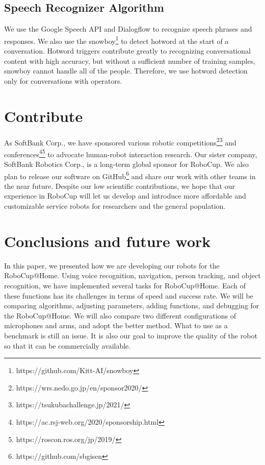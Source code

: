 \documentclass[runningheads,a4paper]{llncs}
\begin{document}
\subsection{Speech Recognizer Algorithm}
We use the Google Speech API and Dialogflow to recognize speech phrases and responses.
We also use the snowboy\footnote{https://github.com/Kitt-AI/snowboy} to detect hotword at the start of a conversation.
Hotword triggers contribute greatly to recognizing conversational content with high accuracy, but without a sufficient number of training samples, snowboy cannot handle all of the people.
Therefore, we use hotword detection only for conversations with operators.

\section{Contribute}
As SoftBank Corp., we have sponsored various robotic competitions\footnote{https://wrs.nedo.go.jp/en/sponsor2020/}\footnote{https://tsukubachallenge.jp/2021/} and conferences\footnote{https://ac.rsj-web.org/2020/sponsorship.html}\footnote{https://roscon.ros.org/jp/2019/} to advocate human-robot interaction research. Our sister company, SoftBank Robotics Corp., is a long-term global sponsor for RoboCup. We also plan to release our software on GitHub\footnote{https://github.com/sbgisen} and share our work with other teams in the near future. Despite our low scientific contributions, we hope that our experience in RoboCup will let us develop and introduce more affordable and customizable service robots for researchers and the general population.

\section{Conclusions and future work}
In this paper, we presented how we are developing our robots for the RoboCup@Home. Using voice recognition, navigation, person tracking, and object recognition, we have implemented several tasks for RoboCup@Home. Each of these functions has its challenges in terms of speed and success rate. We will be comparing algorithms, adjusting parameters, adding functions, and debugging for the RoboCup@Home. We will also compare two different configurations of microphones and arms, and adopt the better method. What to use as a benchmark is still an issue. It is also our goal to improve the quality of the robot so that it can be commercially available.

%
%




%
%

\robospecs


\nocite{*}
\end{document}

